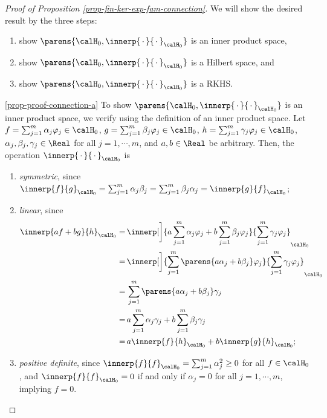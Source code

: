\documentclass[12pt]{article}
\theoremstyle{definition}
\theoremstyle{theorem}
\theoremstyle{remark}
\begin{document}
\begin{proof}[Proof of Proposition \ref{prop-fin-ker-exp-fam-connection}]
	
	We will show the desired result by the three steps: 
	\begin{enumerate}[label=(\alph*)]
		\item \label{prop-proof-connection-a} show $\parens{\calH_{0}, \innerp{\,\cdot\,}{\,\cdot\,}_{\calH_0}}$ is an inner product space, 
		\item \label{prop-proof-connection-b} show $\parens{\calH_0, \innerp{\,\cdot\,}{\,\cdot\,}_{\calH_0}}$ is a Hilbert space, and
		\item \label{prop-proof-connection-c} show $\parens{\calH_0, \innerp{\,\cdot\,}{\,\cdot\,}_{\calH_0}}$ is a RKHS. 
	\end{enumerate}
	
	\ref{prop-proof-connection-a} To show $\parens{\calH_0, \innerp{\,\cdot\,}{\,\cdot\,}_{\calH_0}}$ is an inner product space, we verify using the definition of an inner product space. Let $f = \sum_{j=1}^m \alpha_j \varphi_j \in \calH_0$, $g = \sum_{j=1}^m \beta_j \varphi_j \in \calH_0$, $h = \sum_{j=1}^m \gamma_j \varphi_j \in \calH_0$, $\alpha_j, \beta_j, \gamma_j \in \Real$ for all $j = 1, \cdots, m$, and $a, b \in \Real$ be arbitrary. Then, the operation $\innerp{\,\cdot\,}{\,\cdot\,}_{\calH_0}$ is 
	\begin{enumerate}[label=(\roman*)]
		\item \textit{symmetric}, since $\innerp{f}{g}_{\calH_0} = \sum_{j=1}^m \alpha_{j} \beta_{j} = \sum_{j=1}^m \beta_{j} \alpha_{j} = \innerp{g}{f}_{\calH_0}$; 
		\item \textit{linear}, since 
		\begin{align*}
			\innerp{a f + b g}{h}_{\calH_0} = & \, \innerp[\bigg]{a \sum_{j=1}^m \alpha_j \varphi_j + b \sum_{j=1}^m \beta_j \varphi_j}{\sum_{j=1}^m \gamma_j \varphi_j}_{\calH_0} \\ 
			= & \, \innerp[\bigg]{\sum_{j=1}^m \parens{a \alpha_j + b \beta_j} \varphi_j}{\sum_{j=1}^m \gamma_j \varphi_j}_{\calH_0} \\ 
			= & \, \sum_{j=1}^m \parens{a \alpha_j + b \beta_j} \gamma_j \\ 
			= & \, a \sum_{j=1}^m \alpha_j \gamma_j + b \sum_{j=1}^m \beta_j \gamma_j \\ 
			= & \, a \innerp{f}{h}_{\calH_0} + b \innerp{g}{h}_{\calH_0}; 
		\end{align*} 
		
		\item \textit{positive definite}, since $\innerp{f}{f}_{\calH_0} = \sum_{j=1}^m \alpha_j^2 \ge 0$ for all $f \in \calH_0$, and $\innerp{f}{f}_{\calH_0} = 0$ if and only if $\alpha_j = 0$ for all $j = 1, \cdots, m$, implying $f = 0$. 
	\end{enumerate}


\end{proof}
\end{document}
